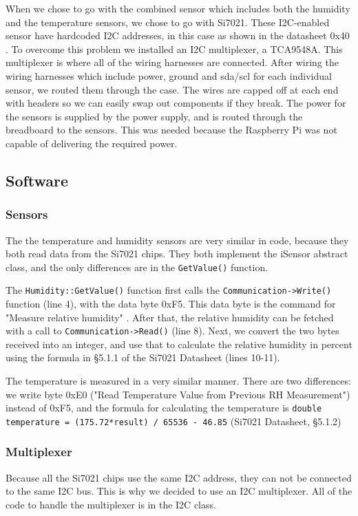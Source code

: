 \documentclass[a4paper,oneside]{book}
\begin{document}
When we chose to go with the combined sensor which includes both the humidity
and the temperature sensors, we chose to go with Si7021. These I2C-enabled
sensor have hardcoded I2C addresses, in this case as shown in the datasheet
0x40 \cite{Si7021}. To overcome this problem we installed an I2C multiplexer, a
TCA9548A. This multiplexer is where all of the wiring harnesses are connected.
After wiring the wiring harnesses which include power, ground and sda/scl for
each individual sensor, we routed them through the case. The wires are capped
off at each end with headers so we can easily swap out components if they
break. The power for the sensors is supplied by the power supply, and is routed
through the breadboard to the sensors. This was needed because the Raspberry Pi
was not capable of delivering the required power. 

\subsection{Software}
\subsubsection{Sensors}
The the temperature and humidity sensors are very similar in code, because they
both read data from the Si7021 chips. They both implement the iSensor abstract
class, and the only differences are in the \lstinline|GetValue()| function.

The \lstinline|Humidity::GetValue()| function first calls the \lstinline|Communication->Write()|
function (line 4), with the data byte 0xF5. This data byte is the command for
"Measure relative humidity" \cite{Si7021}. After that, the
relative humidity can be fetched with a call to \lstinline|Communication->Read()| (line 8).
Next, we convert the two bytes received into an integer, and use that to
calculate the relative humidity in percent using the formula in \S5.1.1 of the
Si7021 Datasheet (lines 10-11).



The temperature is measured in a very similar manner. There are two
differences: we write byte 0xE0 ("Read Temperature Value from Previous RH
Measurement") instead of 0xF5, and the formula for calculating the temperature
is \lstinline|double temperature = (175.72*result) / 65536 - 46.85| (Si7021
Datasheet, \S5.1.2)

\subsubsection{Multiplexer}
Because all the Si7021 chips use the same I2C address, they can not be
connected to the same I2C bus. This is why we decided to use an I2C
multiplexer. All of the code to handle the multiplexer is in the I2C class.
\end{document}
